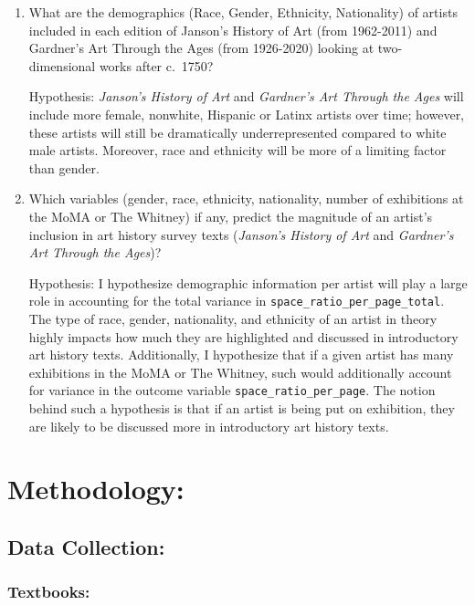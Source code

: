 \documentclass[
  letterpaper,
  DIV=11,
  numbers=noendperiod]{scrreprt}
\begin{document}
\begin{enumerate}
\def\labelenumi{\arabic{enumi}.}
\item
  What are the demographics (Race, Gender, Ethnicity, Nationality) of
  artists included in each edition of Janson's History of Art (from
  1962-2011) and Gardner's Art Through the Ages (from 1926-2020) looking
  at two-dimensional works after c.~1750?

  Hypothesis: \emph{Janson's History of Art} and \emph{Gardner's Art
  Through the Ages} will include more female, nonwhite, Hispanic or
  Latinx artists over time; however, these artists will still be
  dramatically underrepresented compared to white male artists.
  Moreover, race and ethnicity will be more of a limiting factor than
  gender.
\item
  Which variables (gender, race, ethnicity, nationality, number of
  exhibitions at the MoMA or The Whitney) if any, predict the magnitude
  of an artist's inclusion in art history survey texts (\emph{Janson's
  History of Art} and \emph{Gardner's Art Through the Ages})?

  Hypothesis: I hypothesize demographic information per artist will play
  a large role in accounting for the total variance in
  \texttt{space\_ratio\_per\_page\_total}. The type of race, gender,
  nationality, and ethnicity of an artist in theory highly impacts how
  much they are highlighted and discussed in introductory art history
  texts. Additionally, I hypothesize that if a given artist has many
  exhibitions in the MoMA or The Whitney, such would additionally
  account for variance in the outcome variable
  \texttt{space\_ratio\_per\_page}. The notion behind such a hypothesis
  is that if an artist is being put on exhibition, they are likely to be
  discussed more in introductory art history texts.
\end{enumerate}

\hypertarget{methodology}{%
\chapter{\texorpdfstring{\textbf{Methodology:}}{Methodology:}}\label{methodology}}

\hypertarget{data-collection}{%
\section{Data Collection:}\label{data-collection}}

\hypertarget{textbooks}{%
\subsection{Textbooks:}\label{textbooks}}
\end{document}
